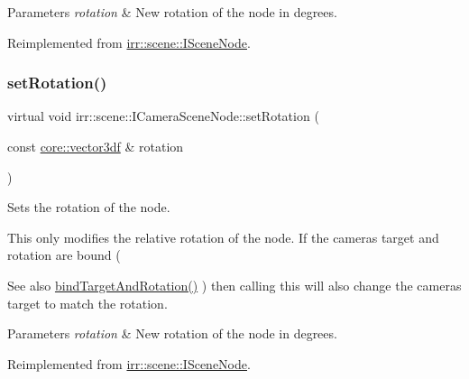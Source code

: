 \begin{DoxyParams}{Parameters}
{\em rotation} & New rotation of the node in degrees. \\
\hline
\end{DoxyParams}


Reimplemented from \hyperlink{classirr_1_1scene_1_1ISceneNode_adb6ff54f52d3a9e1514cd487a550935c}{irr\+::scene\+::\+I\+Scene\+Node}.

\mbox{\label{classirr_1_1scene_1_1ICameraSceneNode_af95d5f50c192f212e11f3f050e92a470}} 
\subsubsection{\texorpdfstring{set\+Rotation()}{setRotation()}\hspace{0.1cm}{\footnotesize\ttfamily [2/2]}}
{\footnotesize\ttfamily virtual void irr\+::scene\+::\+I\+Camera\+Scene\+Node\+::set\+Rotation (\begin{DoxyParamCaption}\item[{const \hyperlink{namespaceirr_1_1core_ae6e2b2a6c552833ebbd5b7463d03586b}{core\+::vector3df} \&}]{rotation }\end{DoxyParamCaption})\hspace{0.3cm}{\ttfamily [pure virtual]}}



Sets the rotation of the node. 

This only modifies the relative rotation of the node. If the camera\textquotesingle{}s target and rotation are bound ( \begin{DoxySeeAlso}{See also}
\hyperlink{classirr_1_1scene_1_1ICameraSceneNode_ad8785d7b2f730933a8d4425ac54e7205}{bind\+Target\+And\+Rotation()} ) then calling this will also change the camera\textquotesingle{}s target to match the rotation. 
\end{DoxySeeAlso}

\begin{DoxyParams}{Parameters}
{\em rotation} & New rotation of the node in degrees. \\
\hline
\end{DoxyParams}


Reimplemented from \hyperlink{classirr_1_1scene_1_1ISceneNode_adb6ff54f52d3a9e1514cd487a550935c}{irr\+::scene\+::\+I\+Scene\+Node}.

